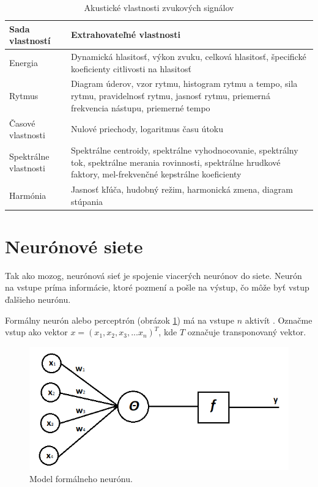 \begin{table}[]
\centering
\caption{Akustické vlastnosti zvukových signálov}
\label{features_table}
\begin{tabular}{l p{10cm}}
\hline
\textbf{Sada vlastností} & \textbf{Extrahovateľné vlastnosti}                                                                                                                                                                             \\ \hline
Energia                  & Dynamická hlasitosť, výkon zvuku, celková hlasitosť, špecifické koeficienty citlivosti na hlasitosť                                                                  \\
Rytmus                   & Diagram úderov, vzor rytmu, histogram rytmu a tempo, sila rytmu, pravidelnosť rytmu, jasnosť rytmu, priemerná frekvencia nástupu, priemerné tempo                  \\
Časové vlastnosti        & Nulové priechody, logaritmus času útoku                                                                                                                                                                        \\
Spektrálne vlastnosti    & Spektrálne centroidy, spektrálne vyhodnocovanie, spektrálny tok, spektrálne merania rovinnosti, spektrálne hrudkové faktory, mel-frekvenčné kepstrálne koeficienty \\
Harmónia                 & Jasnosť kľúča, hudobný režim, harmonická zmena, diagram stúpania                                                                                                     \\ \hline
\end{tabular}
\end{table}

\section{Neurónové siete}
Tak ako mozog, neurónová sieť je spojenie viacerých neurónov do siete.
Neurón na vstupe príma informácie, ktoré pozmení a pošle na výstup, čo môže byť vstup ďalšieho neurónu.

Formálny neurón alebo perceptrón (obrázok \ref{formal_neuron}) má na vstupe \(n\) aktivít \cite{NNKvasnicka}.
Označme vstup ako vektor \(x = (x_1, x_2, x_3, ... x_n)^T\), kde \(T\) označuje transponovaný vektor.

\begin{figure}[!ht] 
	\centering 
	\includegraphics[width=.6\textwidth]{figures/perceptron} 
	\caption{Model formálneho neurónu.} 
	\label{formal_neuron}
\end{figure}

